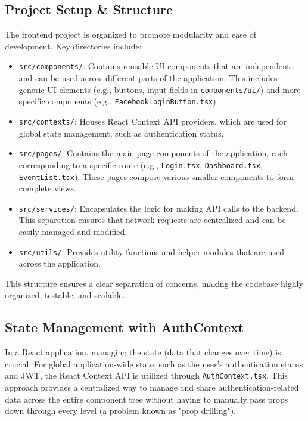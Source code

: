 \documentclass{report}
\begin{document}
\subsection{Project Setup \& Structure}
\label{sec:frontend_project_structure}
The frontend project is organized to promote modularity and ease of development. Key directories include:
\begin{itemize}
    \item \texttt{src/components/}: Contains reusable UI components that are independent and can be used across different parts of the application. This includes generic UI elements (e.g., buttons, input fields in \texttt{components/ui/}) and more specific components (e.g., \texttt{FacebookLoginButton.tsx}).
    \item \texttt{src/contexts/}: Houses React Context API providers, which are used for global state management, such as authentication status.
    \item \texttt{src/pages/}: Contains the main page components of the application, each corresponding to a specific route (e.g., \texttt{Login.tsx}, \texttt{Dashboard.tsx}, \texttt{EventList.tsx}). These pages compose various smaller components to form complete views.
    \item \texttt{src/services/}: Encapsulates the logic for making API calls to the backend. This separation ensures that network requests are centralized and can be easily managed and modified.
    \item \texttt{src/utils/}: Provides utility functions and helper modules that are used across the application.
\end{itemize}
This structure ensures a clear separation of concerns, making the codebase highly organized, testable, and scalable.

\subsection{State Management with AuthContext}
\label{sec:state_management_authcontext}
In a React application, managing the state (data that changes over time) is crucial. For global application-wide state, such as the user's authentication status and JWT, the React Context API is utilized through \texttt{AuthContext.tsx}. This approach provides a centralized way to manage and share authentication-related data across the entire component tree without having to manually pass props down through every level (a problem known as "prop drilling").
\end{document}
